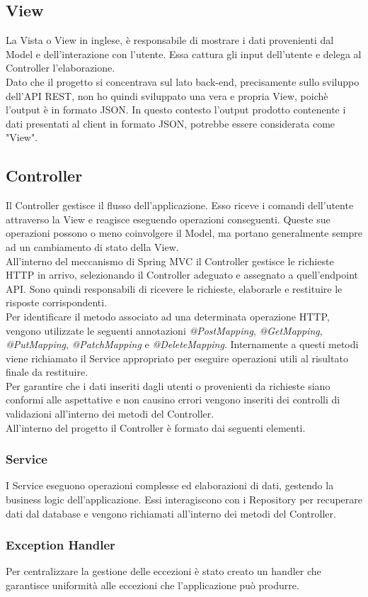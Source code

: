 \subsection{View}
La Vista o View in inglese, è responsabile di mostrare i dati provenienti dal Model e dell'interazione con l'utente. Essa cattura gli input dell'utente e delega al Controller l'elaborazione.\\
Dato che il progetto si concentrava sul lato back-end, precisamente sullo sviluppo dell'API REST, non ho quindi sviluppato una vera e propria View, poichè l'output è in formato JSON. In questo contesto l'output prodotto contenente i dati presentati al client in formato JSON, potrebbe essere considerata come "View".\\

\subsection{Controller}
Il Controller gestisce il flusso dell'applicazione. Esso riceve i comandi dell'utente attraverso la View e reagisce eseguendo operazioni conseguenti. Queste sue operazioni possono o meno coinvolgere il Model, ma portano generalmente sempre ad un cambiamento di stato della View.\\
All'interno del meccanismo di Spring MVC il Controller gestisce le richieste HTTP in arrivo, selezionando il Controller adeguato e assegnato a quell'endpoint API. Sono quindi responsabili di ricevere le richieste, elaborarle e restituire le risposte corrispondenti.\\
Per identificare il metodo associato ad una determinata operazione HTTP, vengono utilizzate le seguenti annotazioni \textit{@PostMapping}, \textit{@GetMapping}, \textit{@PutMapping}, \textit{@PatchMapping} e \textit{@DeleteMapping}. Internamente a questi metodi viene richiamato il Service appropriato per eseguire operazioni utili al risultato finale da restituire.\\
Per garantire che i dati inseriti dagli utenti o provenienti da richieste siano conformi alle aspettative e non causino errori vengono inseriti dei controlli di validazioni all'interno dei metodi del Controller.\\
All'interno del progetto il Controller è formato dai seguenti elementi.
\subsubsection{Service}
I Service eseguono operazioni complesse ed elaborazioni di dati, gestendo la business logic dell'applicazione. Essi interagiscono con i Repository per recuperare dati dal database e vengono richiamati all'interno dei metodi del Controller.
\subsubsection{Exception Handler}
Per centralizzare la gestione delle eccezioni è stato creato un handler che garantisce uniformità alle eccezioni che l'applicazione può produrre.
